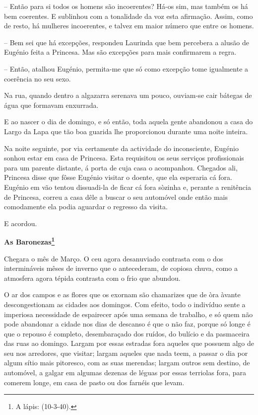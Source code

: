\documentclass[9pt]{article}
\begin{document}
-- Então para si todos os homens são incoerentes? Há-os sim, mas
também os há bem coerentes. E sublinhou com a tonalidade da voz esta
afirma\-ção. Assim, como de resto, há mu\-lheres incoerentes, e talvez em maior
número que entre os homens.

-- Bem sei que há excep\-ções, respondeu Laurinda que bem percebera a
alusão de Eugé\-nio feita a Princesa. Mas são excep\-ções para mais confirmarem a regra.

-- Então, ata\-lhou Eugé\-nio, permita-me que só como excep\-ção tome igualmente a coerência no seu sexo.

Na rua, quan\-do dentro a algazarra serenava um pouco, ouviam-se cair
bátegas de água que formavam enxurrada.

E ao nascer o dia de domingo, e só então, toda aquela gente abandonou a casa do Largo da Lapa que tão boa guarida lhe proporcionou durante uma noite inteira.

Na noite seguinte, por via certamente da actividade do inconsciente, Eugé\-nio sonhou estar em casa de Princesa. Esta requisitou os seus
serviços profissionais para um parente distante, á porta de cuja casa
o acompanhou. Chegados ali, Princesa disse que fôsse Eugé\-nio visitar o
doente, que ela esperaria cá fora. Eugé\-nio em vão tentou dissuadi-la
de fi\-car cá fora sòzinha e, perante a renitência de Princesa, correu a
casa dêle a buscar o seu automóvel onde então mais comodamente ela podia
aguardar o regresso da visita.

E acordou.

\begin{center}\bf\large As Baronezas\footnote{A lápis: (10-3-40).}\end{center}

Chegara o mês de Março. O ceu agora desanuviado contrasta com o dos
intermináveis mêses de inverno que o antecederam, de copiosa chuva, como
a atmosfera agora tépida contrasta com o frio que abundou.

O ar dos campos e as flores que os exornam são chamarizes que de
òra àvante descongestionam as cidades aos domingos. Com efeito, todo o
indivíduo sente a imperiosa necessidade de espairecer após uma semana
de traba\-lho, e só quem não pode abandonar a cidade nos dias de descanso
é que o não faz, porque só longe é que o repouso é completo, desembaraçado dos ruídos, do bulício e da pasmaceira das ruas ao domingo. Largam
por essas estradas fora aqueles que possuem algo de seu nos arredores,
que visitar; largam aqueles que nada teem, a passar o dia por algum
sítio mais pitoresco, com as suas merendas; largam outros sem destino, de
automóvel, a galgar em algumas dezenas de léguas por essas terriolas fora,
para comerem longe, em casa de pasto ou dos farnéis que levam.
\end{document}
